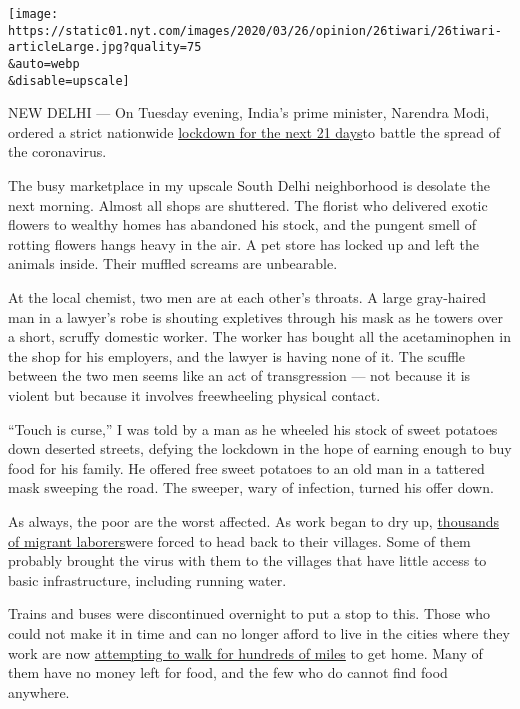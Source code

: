\texttt{[image: https://static01.nyt.com/images/2020/03/26/opinion/26tiwari/26tiwari-articleLarge.jpg?quality=75\\\&auto=webp\\\&disable=upscale]}

NEW DELHI --- On Tuesday evening, India's prime minister, Narendra Modi,
ordered a strict nationwide
\href{https://www.nytimes.com/2020/03/24/world/asia/india-coronavirus-lockdown.html}{lockdown
for the next 21 days}to battle the spread of the coronavirus.

The busy marketplace in my upscale South Delhi neighborhood is desolate
the next morning. Almost all shops are shuttered. The florist who
delivered exotic flowers to wealthy homes has abandoned his stock, and
the pungent smell of rotting flowers hangs heavy in the air. A pet store
has locked up and left the animals inside. Their muffled screams are
unbearable.

At the local chemist, two men are at each other's throats. A large
gray-haired man in a lawyer's robe is shouting expletives through his
mask as he towers over a short, scruffy domestic worker. The worker has
bought all the acetaminophen in the shop for his employers, and the
lawyer is having none of it. The scuffle between the two men seems like
an act of transgression --- not because it is violent but because it
involves freewheeling physical contact.

``Touch is curse,'' I was told by a man as he wheeled his stock of sweet
potatoes down deserted streets, defying the lockdown in the hope of
earning enough to buy food for his family. He offered free sweet
potatoes to an old man in a tattered mask sweeping the road. The
sweeper, wary of infection, turned his offer down.

As always, the poor are the worst affected. As work began to dry up,
\href{https://scroll.in/article/957166/coronavirus-lockdown-narendra-modi-has-cut-indias-poor-adrift}{thousands
of migrant laborers}were forced to head back to their villages. Some of
them probably brought the virus with them to the villages that have
little access to basic infrastructure, including running water.

Trains and buses were discontinued overnight to put a stop to this.
Those who could not make it in time and can no longer afford to live in
the cities where they work are now
\href{https://www.ndtv.com/india-news/36-hours-80-km-long-walk-home-for-labourers-amid-coronavirus-lockdown-2200450}{attempting
to walk for hundreds of miles} to get home. Many of them have no money
left for food, and the few who do cannot find food anywhere.

